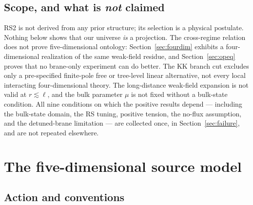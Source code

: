 \documentclass[11pt,a4paper]{article}
\theoremstyle{plain}
\theoremstyle{definition}
\begin{document}
\subsection{Scope, and what is \emph{not} claimed}
\label{sec:scope}

RS2 is not derived from any prior structure; its selection is a physical
postulate. Nothing below shows that our universe \emph{is} a projection.
The cross-regime relation does not prove five-dimensional ontology:
Section~\ref{sec:fourdim} exhibits a four-dimensional realization of the
same weak-field residue, and Section~\ref{sec:opeq} proves that no
brane-only experiment can do better. The KK branch cut excludes only a
pre-specified finite-pole free or tree-level linear alternative, not every
local interacting four-dimensional theory. The long-distance weak-field
expansion is not valid at $r\lesssim\ell$, and the bulk parameter $\mu$ is
not fixed without a bulk-state condition. All nine conditions on which the
positive results depend --- including the bulk-state domain, the RS
tuning, positive tension, the no-flux assumption, and the detuned-brane
limitation --- are collected once, in Section~\ref{sec:failure}, and are
not repeated elsewhere.

\section{The five-dimensional source model}
\label{sec:model}

\subsection{Action and conventions}
\end{document}
